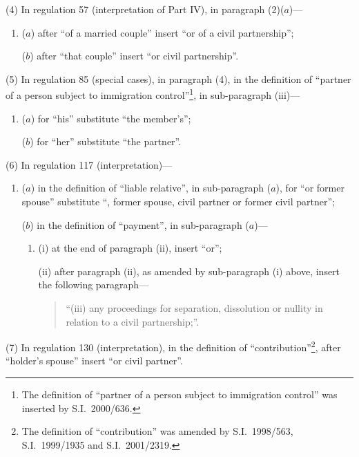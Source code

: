 \documentclass[12pt,a4paper]{article}
\begin{document}
(4) In regulation 57 (interpretation of Part IV), in paragraph (2)($a$)—
\begin{enumerate}\item[]
($a$) after “of a married couple” insert “or of a civil partnership”;

($b$) after “that couple” insert “or civil partnership”.
\end{enumerate}

(5) In regulation 85 (special cases), in paragraph (4), in the definition of “partner of a person subject to immigration control”\footnote{The definition of “partner of a person subject to immigration control” was inserted by S.I.\ 2000/636.}, in sub-paragraph (iii)—
\begin{enumerate}\item[]
($a$) for “his” substitute “the member's”;

($b$) for “her” substitute “the partner”.
\end{enumerate}

(6) In regulation 117 (interpretation)—
\begin{enumerate}\item[]
($a$) in the definition of “liable relative”, in sub-paragraph ($a$), for “or former spouse” substitute “, former spouse, civil partner or former civil partner”;

($b$) in the definition of “payment”, in sub-paragraph ($a$)—
\begin{enumerate}\item[]
(i) at the end of paragraph (ii), insert “or”;

(ii) after paragraph (ii), as amended by sub-paragraph (i)  above, insert the following paragraph—
\begin{quotation}
“(iii) any proceedings for separation, dissolution or nullity in relation to a civil partnership;”.
\end{quotation}
\end{enumerate}
\end{enumerate}

(7) In regulation 130 (interpretation), in the definition of “contribution”\footnote{The definition of “contribution” was amended by S.I.\ 1998/563, S.I.\ 1999/1935 and S.I.\ 2001/2319.}, after “holder’s spouse” insert “or civil partner”.
\end{document}

